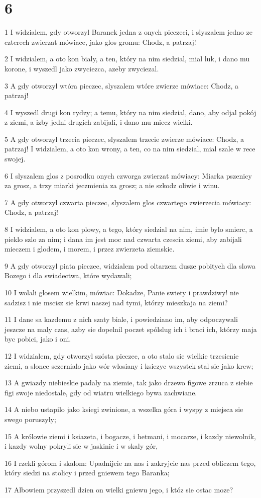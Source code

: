 \chapter{6}

\par 1 I widzialem, gdy otworzyl Baranek jedna z onych pieczeci, i slyszalem jedno ze czterech zwierzat mówiace, jako glos gromu: Chodz, a patrzaj!
\par 2 I widzialem, a oto kon bialy, a ten, który na nim siedzial, mial luk, i dano mu korone, i wyszedl jako zwyciezca, azeby zwyciezal.
\par 3 A gdy otworzyl wtóra pieczec, slyszalem wtóre zwierze mówiace: Chodz, a patrzaj!
\par 4 I wyszedl drugi kon rydzy; a temu, który na nim siedzial, dano, aby odjal pokój z ziemi, a izby jedni drugich zabijali, i dano mu miecz wielki.
\par 5 A gdy otworzyl trzecia pieczec, slyszalem trzecie zwierze mówiace: Chodz, a patrzaj! I widzialem, a oto kon wrony, a ten, co na nim siedzial, mial szale w rece swojej.
\par 6 I slyszalem glos z posrodku onych czworga zwierzat mówiacy: Miarka pszenicy za grosz, a trzy miarki jeczmienia za grosz; a nie szkodz oliwie i winu.
\par 7 A gdy otworzyl czwarta pieczec, slyszalem glos czwartego zwierzecia mówiacy: Chodz, a patrzaj!
\par 8 I widzialem, a oto kon plowy, a tego, który siedzial na nim, imie bylo smierc, a pieklo szlo za nim; i dana im jest moc nad czwarta czescia ziemi, aby zabijali mieczem i glodem, i morem, i przez zwierzeta ziemskie.
\par 9 A gdy otworzyl piata pieczec, widzialem pod oltarzem dusze pobitych dla slowa Bozego i dla swiadectwa, które wydawali;
\par 10 I wolali glosem wielkim, mówiac: Dokadze, Panie swiety i prawdziwy! nie sadzisz i nie mscisz sie krwi naszej nad tymi, którzy mieszkaja na ziemi?
\par 11 I dane sa kazdemu z nich szaty biale, i powiedziano im, aby odpoczywali jeszcze na maly czas, azby sie dopelnil poczet spólslug ich i braci ich, którzy maja byc pobici, jako i oni.
\par 12 I widzialem, gdy otworzyl szósta pieczec, a oto stalo sie wielkie trzesienie ziemi, a slonce sczernialo jako wór wlosiany i ksiezyc wszystek stal sie jako krew;
\par 13 A gwiazdy niebieskie padaly na ziemie, tak jako drzewo figowe zrzuca z siebie figi swoje niedostale, gdy od wiatru wielkiego bywa zachwiane.
\par 14 A niebo ustapilo jako ksiegi zwinione, a wszelka góra i wyspy z miejsca sie swego poruszyly;
\par 15 A królowie ziemi i ksiazeta, i bogacze, i hetmani, i mocarze, i kazdy niewolnik, i kazdy wolny pokryli sie w jaskinie i w skaly gór,
\par 16 I rzekli górom i skalom: Upadnijcie na nas i zakryjcie nas przed obliczem tego, który siedzi na stolicy i przed gniewem tego Baranka;
\par 17 Albowiem przyszedl dzien on wielki gniewu jego, i któz sie ostac moze?


